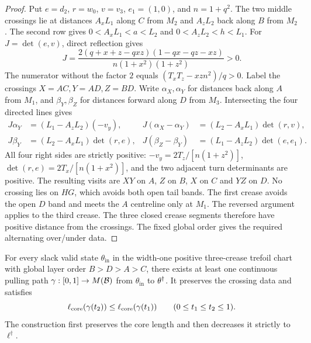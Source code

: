 \begin{proof}
Put $e=d_2$, $r=w_0$, $v=v_3$, $e_1=(1,0)$, and $n=1+q^2$. The two middle crossings lie at distances $A_xL_1$ along $C$ from $M_2$ and $A_zL_2$ back along $B$ from $M_2$. The second row gives $0<A_xL_1<a<L_2$ and $0<A_zL_2<h<L_1$. For $J=\det(e,v)$, direct reflection gives
\[
 J=\frac{2(q+x+z-qxz)(1-qx-qz-xz)}{n(1+x^2)(1+z^2)}>0.
\]
The numerator without the factor $2$ equals $(T_xT_z-xzn^2)/q>0$. Label the crossings $X=AC,Y=AD,Z=BD$. Write $\alpha_X,\alpha_Y$ for distances back along $A$ from $M_1$, and $\beta_Y,\beta_Z$ for distances forward along $D$ from $M_3$. Intersecting the four directed lines gives
\[
\begin{aligned}
 J\alpha_Y&=(L_1-A_zL_2)(-v_y),&
 J(\alpha_X-\alpha_Y)&=(L_2-A_xL_1)\det(r,v),\\
 J\beta_Y&=(L_2-A_xL_1)\det(r,e),&
 J(\beta_Z-\beta_Y)&=(L_1-A_zL_2)\det(e,e_1).
\end{aligned}
\]
All four right sides are strictly positive: $-v_y=2T_z/[n(1+z^2)]$, $\det(r,e)=2T_x/[n(1+x^2)]$, and the two adjacent turn determinants are positive. The resulting visits are $XY$ on $A$, $Z$ on $B$, $X$ on $C$ and $YZ$ on $D$. No crossing lies on $HG$, which avoids both open tail bands. The first crease avoids the open $D$ band and meets the $A$ centreline only at $M_1$. The reversed argument applies to the third crease. The three closed crease segments therefore have positive distance from the crossings. The fixed global order gives the required alternating over/under data.
\end{proof}

\begin{theorem}\label{thm:slackreach}
For every slack valid state $\theta_{\mathrm{in}}$ in the width-one positive three-crease trefoil chart with global layer order $B>D>A>C$, there exists at least one continuous pulling path $\gamma:[0,1]\to M(\mathcal{B})$ from $\theta_{\mathrm{in}}$ to $\theta^\dagger$. It preserves the crossing data and satisfies
\[
 \ell_{\mathrm{core}}(\gamma(t_2))\le\ell_{\mathrm{core}}(\gamma(t_1))\qquad(0\le t_1\le t_2\le1).
\]
The construction first preserves the core length and then decreases it strictly to $\ell^\dagger$.
\end{theorem}

